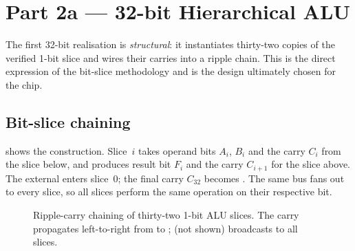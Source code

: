 \chapter{Part 2a --- 32-bit Hierarchical ALU}
\label{ch:part2a}

The first 32-bit realisation is \emph{structural}: it instantiates
thirty-two copies of the verified 1-bit slice and wires their carries into
a ripple chain. This is the direct expression of the bit-slice methodology
and is the design ultimately chosen for the chip.

\section{Bit-slice chaining}
 shows the construction. Slice~$i$ takes operand bits
$A_i$, $B_i$ and the carry $C_i$ from the slice below, and produces result
bit $F_i$ and the carry $C_{i+1}$ for the slice above. The external
 enters slice~0; the final carry $C_{32}$ becomes . The
same \sel{} bus fans out to every slice, so all slices perform the same
operation on their respective bit.

\begin{figure}[htbp]
\centering
{}
\caption{Ripple-carry chaining of thirty-two 1-bit ALU slices. The carry
propagates left-to-right from  to ; \sel{} (not shown)
broadcasts to all slices.}
\label{fig:chain}
\end{figure}

